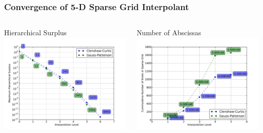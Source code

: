 \documentclass{beamer}
\begin{document}
\begin{frame}
\frametitle{Convergence of 5-D Sparse Grid Interpolant}

\begin{columns}
 \begin{column}{0.5\textwidth}
  \centering
  Hierarchical Surplus  
  \includegraphics[width=1.\textwidth]{./kinf_sparse_grid_convergence.pdf}
 \end{column}
 \begin{column}{0.5\textwidth}
  \centering
  Number of Abscissas 
  \includegraphics[width=1.\textwidth]{./kinf_sparse_grid_numknots.pdf}
 \end{column}
\end{columns}

\end{frame}
\end{document}
